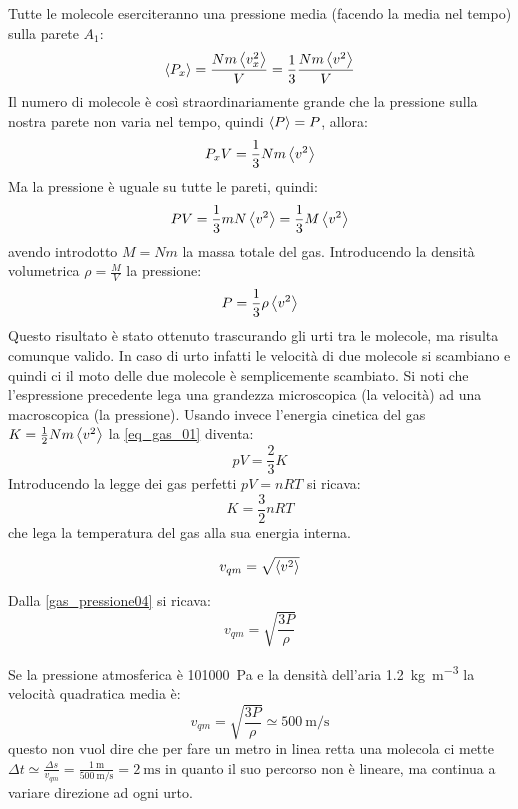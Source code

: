 Tutte le molecole eserciteranno una pressione media (facendo la media nel tempo) sulla parete $A_1$:
\begin{equation}
   \left<P_x\right>=\frac{Nm\left<v_x^2\right>}{V}=\frac{1}{3}\frac{Nm\left<v^2\right>}{V}
\end{equation}
Il numero di molecole è così straordinariamente grande che la pressione sulla nostra parete non varia nel tempo, quindi $\left<P\right>=P$, allora:
\[P_x V=\frac{1}{3}Nm\left<v^2\right>\]
Ma la pressione è uguale su tutte le pareti, quindi:
\begin{equation}
   PV=\frac{1}{3}mN\left<v^2\right>=\frac{1}{3}M\left<v^2\right>
   \label{eq_gas_01}
\end{equation}
avendo introdotto $M=Nm$ la massa totale del gas. Introducendo la densità volumetrica $\rho=\frac{M}{V}$ la pressione:
\begin{equation}
   P=\frac{1}{3}\rho\left<v^2\right>
   \label{gas_pressione04}
\end{equation}
Questo risultato è stato ottenuto trascurando gli urti tra le molecole, ma risulta comunque valido. In caso di urto infatti le velocità di due molecole si scambiano e quindi ci il moto delle due molecole è semplicemente scambiato. Si noti che l'espressione precedente lega una grandezza microscopica (la velocità) ad una macroscopica (la pressione).
Usando invece l'energia cinetica del gas $K=\frac{1}{2}Nm\left<v^2\right>$ la \eqref{eq_gas_01} diventa:
\begin{equation}
   pV=\frac{2}{3}K
\end{equation}
Introducendo la legge dei gas perfetti $pV=nRT$ si ricava:
\begin{equation}
   K = \frac{3}{2}nRT
\end{equation}
che lega la temperatura del gas alla sua energia interna.
\begin{Def}
   \begin{equation}
      v_{qm}=\sqrt{\left<v^2\right>}
   \end{equation}
\end{Def}
Dalla \eqref{gas_pressione04} si ricava:
\begin{equation}
   v_{qm}=\sqrt{\frac{3P}{\rho}}
\end{equation}
\begin{Es}
   Se la pressione atmosferica è \SI{101000}{\pascal} e la densità dell'aria \SI{1.2}{\kilo\gram\per\cubic\meter} la velocità quadratica media è:
   \[
      v_{qm}=\sqrt{\frac{3P}{\rho}}\simeq\SI{500}{\meter\per\second}
   \]
   questo non vuol dire che per fare un metro in linea retta una molecola ci mette $\Delta t \simeq \frac{\Delta s}{v_{qm}}=\frac{\SI{1}{\meter}}{\SI{500}{\meter\per\second}}=\SI{2}{\milli\second}$ in quanto il suo percorso non è lineare, ma continua a variare direzione ad ogni urto.
\end{Es}
